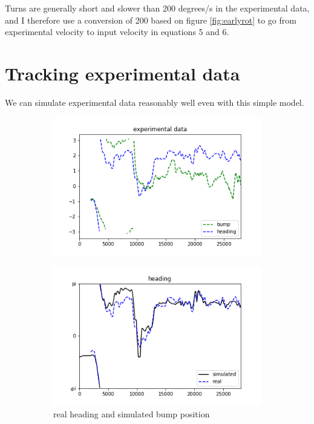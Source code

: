 \documentclass{article}
\begin{document}
Turns are generally short and slower than 200 degrees/s in the experimental data, and I therefore use a conversion of 200 based on figure \ref{fig:earlyrot} to go from experimental velocity to input velocity in equations 5 and 6.

\section*{Tracking experimental data}

We can simulate experimental data reasonably well even with this simple model.

\begin{figure}[h]
	\centering
	\begin{subfigure}[t]{0.46\linewidth}
		\centering
		\includegraphics[width = 1.0\linewidth, trim={40 20 40 20}, clip=true]{../figures/real_heading.png}
		\label{fig:real_head}	
	\end{subfigure}
	\hspace{0.05\linewidth}
	\begin{subfigure}[t]{0.46\linewidth}
		\centering
		\includegraphics[width = 1.0\linewidth, trim={40 20 40 20}, clip=true]{../figures/sim_head.png}
		\caption{real heading and simulated bump position}
		\label{fig:head}
	\end{subfigure}
\caption{}
\label{fig:real_head_vel}
\end{figure}
\end{document}
